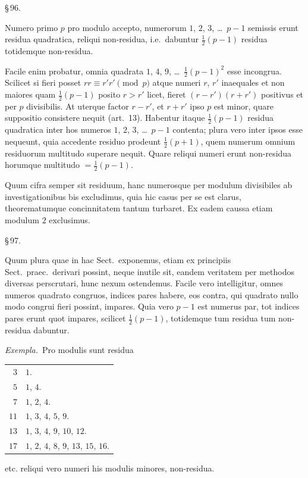 \documentclass[12pt,a4paper]{article}
\theoremstyle{plain}
\theoremstyle{definition}
\theoremstyle{remark}
\begin{document}
\begin{center}\S\,96.\end{center}

Numero primo $p$ pro modulo accepto, numerorum $1$, $2$, $3$, \dots\ $p-1$ semissis erunt residua quadratica, reliqui non-residua, i.e.\ dabuntur $\frac{1}{2}(p-1)$ residua totidemque non-residua.

Facile enim probatur, omnia quadrata $1$, $4$, $9$, \dots\ $\frac{1}{2}(p-1)^2$ esse incongrua. Scilicet si fieri posset $rr \equiv r'r' \pmod{p}$ atque numeri $r$, $r'$ inaequales et non maiores quam $\frac{1}{2}(p-1)$ posito $r > r'$ licet, fieret $(r-r')(r+r')$ positivus et per $p$ divisibilis. At uterque factor $r-r'$, et $r+r'$ ipso $p$ est minor, quare suppositio consistere nequit (art.~13). Habentur itaque $\frac{1}{2}(p-1)$ residua quadratica inter hos numeros $1$, $2$, $3$, \dots\ $p-1$ contenta; plura vero inter ipsos esse nequeunt, quia accedente residuo prodeunt $\frac{1}{2}(p+1)$, quem numerum omnium residuorum multitudo superare nequit. Quare reliqui numeri erunt non-residua horumque multitudo $= \frac{1}{2}(p-1)$.

Quum cifra semper sit residuum, hanc numerosque per modulum divisibiles ab investigationibus bis excludimus, quia hic casus per se est clarus, theorematumque concinnitatem tantum turbaret. Ex eadem caussa etiam modulum $2$ exclusimus.

\begin{center}\S\,97.\end{center}

Quum plura quae in hac Sect.\ exponemus, etiam ex principiis Sect.\ praec.\ derivari possint, neque inutile sit, eandem veritatem per methodos diversas perscrutari, hunc nexum ostendemus. Facile vero intelligitur, omnes numeros quadrato congruos, indices pares habere, eos contra, qui quadrato nullo modo congrui fieri possint, impares. Quia vero $p-1$ est numerus par, tot indices pares erunt quot impares, scilicet $\frac{1}{2}(p-1)$, totidemque tum residua tum non-residua dabuntur.

\textit{Exempla.}\ Pro modulis sunt residua
\begin{center}
\begin{tabular}{r|l}
$3$ & $1$. \\
$5$ & $1$, $4$. \\
$7$ & $1$, $2$, $4$. \\
$11$ & $1$, $3$, $4$, $5$, $9$. \\
$13$ & $1$, $3$, $4$, $9$, $10$, $12$. \\
$17$ & $1$, $2$, $4$, $8$, $9$, $13$, $15$, $16$.
\end{tabular}
\end{center}
etc. reliqui vero numeri his modulis minores, non-residua.
\end{document}
